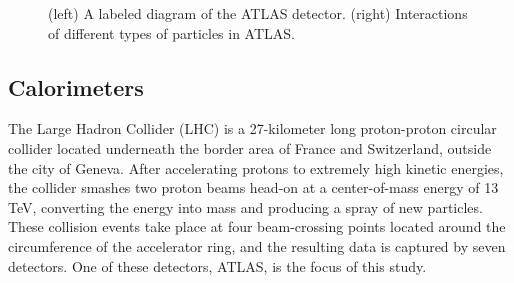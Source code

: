 \begin{figure}[t]
    \centering
    \caption{(left) A labeled diagram of the ATLAS detector. (right) Interactions of different types of particles in ATLAS.}
    \label{ATLAS}
\end{figure}


\subsection*{Calorimeters}


The Large Hadron Collider (LHC) is a 27-kilometer long proton-proton circular collider located underneath the border area of France and Switzerland, outside the city of Geneva. After accelerating protons to extremely high kinetic energies, the collider smashes two proton beams head-on at a center-of-mass energy of 13 TeV, converting the energy into mass and producing a spray of new particles. These collision events take place at four beam-crossing points located around the circumference of the accelerator ring, and the resulting data is captured by seven detectors. One of these detectors, ATLAS, is the focus of this study.

